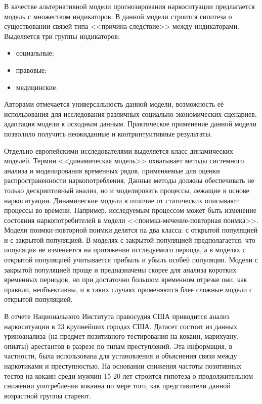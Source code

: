 В качестве альтернативной модели прогнозирования наркоситуации предлагается
модель с множеством индикаторов. В данной модели строится гипотеза о
существовании связей типа <<причина-следствие>> между индикаторами. Выделяется
три группы индикаторов: 
\begin{itemize}
    \item социальные;
    \item правовые;
    \item медицинские.
\end{itemize}
Авторами отмечается универсальность данной модели, возможность её использования
для исследования различных социально-экономических сценариев, адаптация модели к
исходным данным. Практическое применение данной модели позволило получить
неожиданные и контринтуитивные результаты. 

Отдельно европейскими исследователями выделяется класс динамических моделей.
Термин <<динамическая модель>> охватывает методы системного анализа и
моделирования временных рядов, применяемые для оценки распространенности
наркопотребления. Данные методы должны обеспечивать не только дескриптивный
анализ, но и моделировать процессы, лежащие в основе наркоситуации. Динамические
модели в отличие от статических описывают процессы во времени. Например,
исследуемым процессом может быть изменение состояния наркопотребителей в модели
<<поимка-мечение-повторная поимка>>. Модели поимки-повторной поимки делятся на
два класса: с открытой популяцией и с закрытой популяцией. В моделях с закрытой
популяцией предполагается, что популяция не изменяется на протяжении
исследуемого периода, а в моделях с открытой популяцией учитывается прибыль и
убыль особей популяции. Модели с закрытой популяцией проще и предназначены
скорее для анализа коротких временных периодов, но при достаточно большом
временном отрезке они, как правило, необъективны, и в таких случаях применяются
блее сложные модели с открытой популяцией.

В отчете Национального Института правосудия США \cite{TravisFeucht1995,
Chaiken1993} приводится анализ наркоситуации в 23 крупнейших городах США.
Датасет состоит из данных уриноанализа (на предмет позитивного тестирования на
кокаин, марихуану, опиаты) арестантов в разрезе по типам преступлений. Эта
информация, в частности, была использована для установления и объяснения связи
между наркотиками и преступностью. На основании снижения частоты позитивных
тестов на кокаин среди мужчин 15-20 лет строится гипотеза о продолжительном
снижении употребления кокаина по мере того, как представители данной возрастной
группы стареют.

